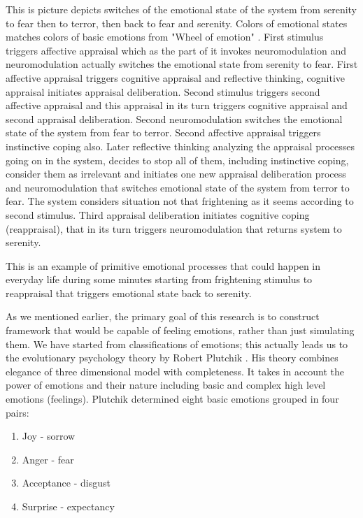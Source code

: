 This is picture depicts switches of the emotional state of the system from serenity to fear then to terror, then back to fear and serenity. Colors of emotional states matches colors of basic emotions from "Wheel of emotion" \cite{natureofemotions}. First stimulus triggers affective appraisal which as the part of it invokes neuromodulation and neuromodulation actually switches the emotional state from serenity to fear. First affective appraisal triggers cognitive appraisal and reflective thinking, cognitive appraisal initiates appraisal deliberation. Second stimulus triggers second affective appraisal and this appraisal in its turn triggers cognitive appraisal and second appraisal deliberation. Second neuromodulation switches the emotional state of the system from fear to terror. Second affective appraisal triggers instinctive coping also.  Later reflective thinking analyzing the appraisal processes going on in the system, decides to stop all of them, including instinctive coping, consider them as irrelevant and initiates one new appraisal deliberation process and neuromodulation that switches emotional state of the system from terror to fear. The system considers situation not that frightening as it seems according to second stimulus. Third appraisal deliberation initiates cognitive coping (reappraisal), that in its turn triggers neuromodulation that returns system to serenity.

This is an example of primitive emotional processes that could happen in everyday life during some minutes starting from frightening stimulus to reappraisal that triggers emotional state back to serenity.

As we mentioned earlier, the primary goal of this research is to construct framework that would be capable of feeling emotions, rather than just simulating them. We have started from classifications of emotions; this actually leads us to the evolutionary psychology theory by Robert Plutchik \cite{natureofemotions}. His theory combines elegance of three dimensional model with completeness. It takes in account the power of emotions and their nature including basic and complex high level emotions (feelings). Plutchik determined eight basic emotions grouped in four pairs:

\begin{enumerate}
 \item  Joy - sorrow
 \item  Anger - fear
 \item  Acceptance - disgust
 \item  Surprise - expectancy
\end{enumerate}

